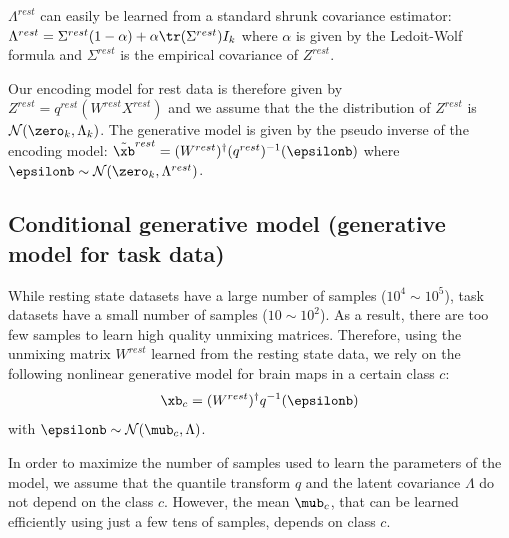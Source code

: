 $\Lambda^{rest}$ can easily be learned from a standard shrunk covariance
estimator: $\Lambda^{rest} = \Sigma^{rest} (1 - \alpha) + \alpha \tr(\Sigma^{rest}) I_k$ where
$\alpha$ is given by the Ledoit-Wolf formula \cite{ledoit2004well} and
$\Sigma^{rest}$ is the empirical covariance of $Z^{rest}$.

Our encoding model for rest data is therefore given by \\ 
$Z^{rest} =
q^{rest}(W^{rest} X^{rest})$ and we assume that the the
distribution of $Z^{rest}$ is $\mathcal{N}(\zero_k, \Lambda_k)$.
The generative model is given by the pseudo inverse of the encoding model:
$\tilde{\xb}^{rest} = (W^{rest})^{\dagger} (q^{rest})^{-1}(\epsilonb)$ where $\epsilonb \sim
\mathcal{N}(\zero_k, \Lambda^{rest})$. 


\subsection{Conditional generative model (generative model for task data)}
While resting state datasets have a large number of samples ($10^4 \sim 10^5$), task datasets   have a small number of samples ($10 \sim 10^2$). As a result, there are too few samples to learn high quality unmixing matrices. 
%
Therefore, using  the unmixing matrix $W^{rest}$ learned from the resting state data, we rely on the following nonlinear generative model for brain maps in a certain class $c$:
\begin{equation}
  \xb_c = (W^{rest})^{\dagger} q^{-1}(\epsilonb)
\end{equation}
with $\epsilonb \sim \mathcal{N}(\mub_c, \Lambda)$.

In order to maximize the number of samples used to learn the parameters of the
model, we assume that the quantile transform $q$ and the latent covariance
$\Lambda$ do not depend on the class $c$. However, the mean $\mub_c$, that can be learned efficiently using just a few tens of samples, depends on class $c$.

